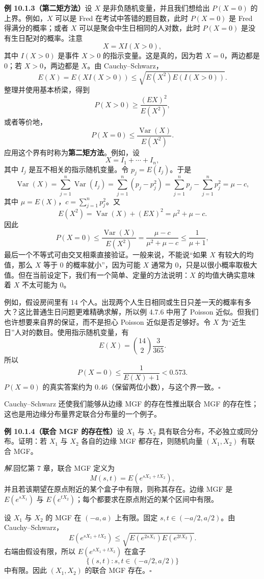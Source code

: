 \documentclass[UTF8, 12pt, fontset=fandol, oneside]{ctexart}
\begin{document}
\noindent\textbf{例 10.1.3（第二矩方法）}\quad 设 $X$ 是非负随机变量，并且我们想给出 $P(X=0)$ 的上界。例如，$X$ 可以是 Fred 在考试中答错的题目数，此时 $P(X=0)$ 是 Fred 得满分的概率；或者 $X$ 可以是聚会中生日相同的人对数，此时 $P(X=0)$ 是没有生日配对的概率。注意
\[
  X=XI(X>0),
\]
其中 $I(X>0)$ 是事件 $X>0$ 的指示变量。这是真的，因为若 $X=0$，两边都是 $0$；若 $X>0$，两边都是 $X$。由 Cauchy--Schwarz，
\[
  E(X)=E(XI(X>0))\le \sqrt{E(X^2)E(I(X>0))}.
\]
整理并使用基本桥梁，得到
\[
  P(X>0)\ge \frac{(EX)^2}{E(X^2)},
\]
或者等价地，
\[
  P(X=0)\le \frac{\operatorname{Var}(X)}{E(X^2)}.
\]
应用这个界有时称为\textbf{第二矩方法}。例如，设
\[
  X=I_1+\cdots+I_n,
\]
其中 $I_j$ 是互不相关的指示随机变量。令 $p_j=E(I_j)$。于是
\[
  \operatorname{Var}(X)=\sum_{j=1}^n\operatorname{Var}(I_j)
  =\sum_{j=1}^n(p_j-p_j^2)
  =\sum_{j=1}^n p_j-\sum_{j=1}^n p_j^2
  =\mu-c,
\]
其中 $\mu=E(X)$，$c=\sum_{j=1}^n p_j^2$。又
\[
  E(X^2)=\operatorname{Var}(X)+(EX)^2=\mu^2+\mu-c.
\]
因此
\[
  P(X=0)\le \frac{\operatorname{Var}(X)}{E(X^2)}
  =\frac{\mu-c}{\mu^2+\mu-c}\le \frac{1}{\mu+1},
\]
最后一个不等式可由交叉相乘直接验证。一般来说，不能说“如果 $X$ 有较大的均值，那么 $X$ 等于 $0$ 的概率就小”，因为可能 $X$ 通常为 $0$，只是以很小概率取极大值。但在当前设定下，我们有一个简单、定量的方法说明：$X$ 的均值大确实意味着 $X$ 不太可能为 $0$。

例如，假设房间里有 $14$ 个人。出现两个人生日相同或生日只差一天的概率有多大？这比普通生日问题更难精确求解，所以例 4.7.6 中用了 Poisson 近似。但我们也许想要来自界的保证，而不是担心 Poisson 近似是否足够好。令 $X$ 为“近生日”人对的数目。使用指示随机变量，有
\[
  E(X)=\binom{14}{2}\frac{3}{365}.
\]
所以
\[
  P(X=0)\le \frac{1}{E(X)+1}<0.573.
\]
$P(X=0)$ 的真实答案约为 $0.46$（保留两位小数），与这个界一致。$\square$

Cauchy--Schwarz 还使我们能够从边缘 MGF 的存在性推出联合 MGF 的存在性；这也是用边缘分布量界定联合分布量的一个例子。

\noindent\textbf{例 10.1.4（联合 MGF 的存在性）}\quad 设 $X_1$ 与 $X_2$ 具有联合分布，不必独立或同分布。证明：若 $X_1$ 与 $X_2$ 各自的边缘 MGF 都存在，则随机向量 $(X_1,X_2)$ 有联合 MGF。

\noindent\textit{解.}\quad 回忆第 7 章，联合 MGF 定义为
\[
  M(s,t)=E(e^{sX_1+tX_2}),
\]
并且若该期望在原点附近的某个盒子中有限，则称其存在。边缘 MGF 是 $E(e^{sX_1})$ 与 $E(e^{tX_2})$；每个都要求在原点附近的某个区间中有限。

设 $X_1$ 与 $X_2$ 的 MGF 在 $(-a,a)$ 上有限。固定 $s,t\in(-a/2,a/2)$。由 Cauchy--Schwarz，
\[
  E(e^{sX_1+tX_2})\le \sqrt{E(e^{2sX_1})E(e^{2tX_2})}.
\]
右端由假设有限，所以 $E(e^{sX_1+tX_2})$ 在盒子
\[
  \{(s,t):s,t\in(-a/2,a/2)\}
\]
中有限。因此 $(X_1,X_2)$ 的联合 MGF 存在。$\square$
\end{document}
